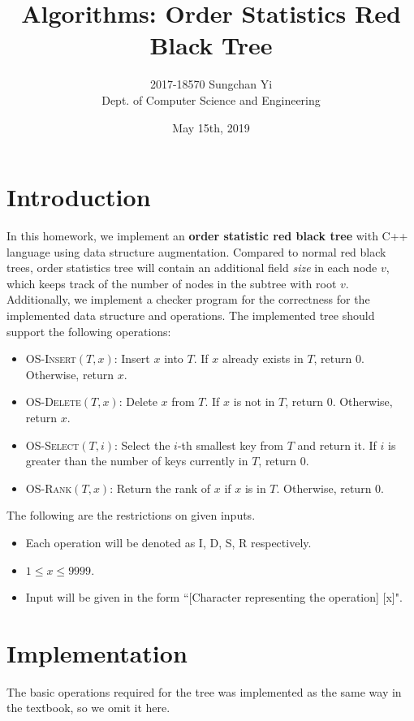 \documentclass[12pt]{article}
\title{\sffamily Algorithms: Order Statistics Red Black Tree}
\author{2017-18570 Sungchan Yi\\Dept. of Computer Science and Engineering}
\date{May 15th, 2019}
\begin{document}
 

\maketitle
\tableofcontents

\section{Introduction}
In this homework, we implement an \textbf{order statistic red black tree} with C++ language using data structure augmentation. Compared to normal red black trees, order statistics tree will contain an additional field \textit{size} in each node $v$, which keeps track of the number of nodes in the subtree with root $v$. Additionally, we implement a checker program for the correctness for the implemented data structure and operations. The implemented tree should support the following operations:
\begin{itemize}
	\item \textsc{OS-Insert}$(T, x)$: Insert $x$ into $T$. If $x$ already exists in $T$, return 0. Otherwise, return $x$.
	\item \textsc{OS-Delete}$(T, x)$: Delete $x$ from $T$. If $x$ is not in $T$, return 0. Otherwise, return $x$.
	\item \textsc{OS-Select}$(T, i)$: Select the $i$-th smallest key from $T$ and return it. If $i$ is greater than the number of keys currently in $T$, return 0.
	\item \textsc{OS-Rank}$(T, x)$: Return the rank of $x$ if $x$ is in $T$. Otherwise, return 0.
\end{itemize}
The following are the restrictions on given inputs.
\begin{itemize}
	\item Each operation will be denoted as I, D, S, R respectively.
	\item $1\leq x \leq 9999$.
	\item Input will be given in the form ``[Character representing the operation] [x]".
\end{itemize}

\section{Implementation}
The basic operations required for the tree was implemented as the same way in the textbook, so we omit it here.
\end{document}
